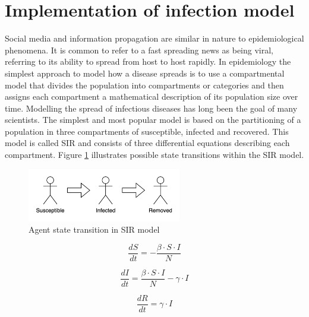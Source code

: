 
\section{Implementation of infection model}

Social media and information propagation are similar in nature to epidemiological phenomena.
It is common to refer to a fast spreading news as being viral, referring to its ability to spread from host to host rapidly.
In epidemiology the simplest approach to model how a disease spreads is to use a compartmental model that divides the population into compartments or categories and then assigns each compartment a mathematical description of its population size over time.
Modelling the spread of infectious diseases has long been the goal of many scientists\cite{liu2016}.
The simplest and most popular model is based on the partitioning of a population in three compartments of susceptible, infected and recovered\cite{weiss2013sir}.
This model is called SIR and consists of three differential equations describing each compartment.
Figure \ref{fig:sir.drawio.png} illustrates possible state transitions within the SIR model.

\begin{figure}[H]
    \centering
    \includegraphics[width=0.6\textwidth]{images/chapter2/sir.drawio.png}
    \caption{Agent state transition in SIR model}\label{fig:sir.drawio.png}
\end{figure}

\begin{equation} \label{eq:sir1}
    \frac{{dS}}{{dt}} = -\frac{{\beta \cdot S \cdot I}}{{N}}
\end{equation}

\begin{equation} \label{eq:sir2}
    \frac{{dI}}{{dt}} = \frac{{\beta \cdot S \cdot I}}{{N}} - \gamma \cdot I
\end{equation}

\begin{equation} \label{eq:sir3}
    \frac{{dR}}{{dt}} = \gamma \cdot I
\end{equation}

